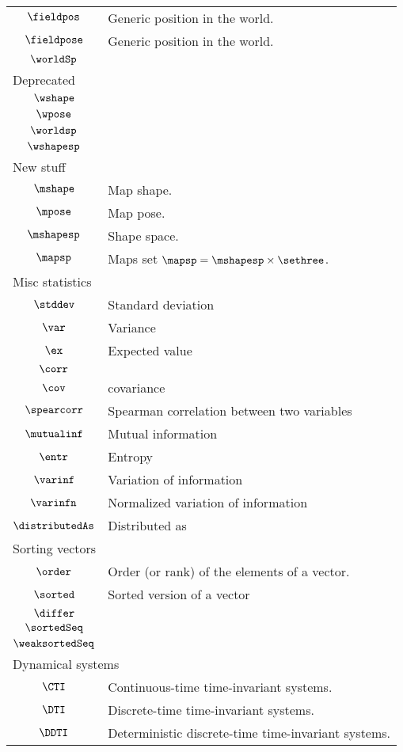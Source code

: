 \begin{longtable}{cl}
 $\fieldpos$ &  Generic position in the world.\\ 
 $\fieldpose$ &  Generic position in the world.\\ 
 $\worldSp$ & \\ 
 \multicolumn{2}{l}{Deprecated}\\ 
 \hline
$\wshape$ & \\ 
 $\wpose$ & \\ 
 $\worldsp$ & \\ 
 $\wshapesp$ & \\ 
 \multicolumn{2}{l}{New stuff}\\ 
 \hline
$\mshape$ &  Map shape.\\ 
 $\mpose$ &  Map pose.\\ 
 $\mshapesp$ &  Shape space.\\ 
 $\mapsp$ &  Maps set $\mapsp = \mshapesp \times \sethree$.\\ 
 \multicolumn{2}{l}{Misc statistics}\\ 
 \hline
$\stddev$ &  Standard deviation\\ 
 $\var$ &  Variance\\ 
 $\ex$ &  Expected value\\ 
 $\corr$ & \\ 
 $\cov$ &  covariance\\ 
 $\spearcorr$ &  Spearman correlation between two variables\\ 
 $\mutualinf$ &  Mutual information\\ 
 $\entr$ &  Entropy\\ 
 $\varinf$ &  Variation of information\\ 
 $\varinfn$ &  Normalized variation of information\\ 
 $\distributedAs$ &  Distributed as\\ 
 \multicolumn{2}{l}{Sorting vectors}\\ 
 \hline
$\order$ &  Order (or rank) of the elements of a vector.\\ 
 $\sorted$ &  Sorted version of a vector\\ 
 $\differ$ & \\ 
 $\sortedSeq$ & \\ 
 $\weaksortedSeq$ & \\ 
 \multicolumn{2}{l}{Dynamical systems}\\ 
 \hline
$\CTI$ &  Continuous-time time-invariant systems.\\ 
 $\DTI$ &  Discrete-time time-invariant systems.\\ 
 $\DDTI$ &  Deterministic discrete-time time-invariant systems.\\ 

\end{longtable}
